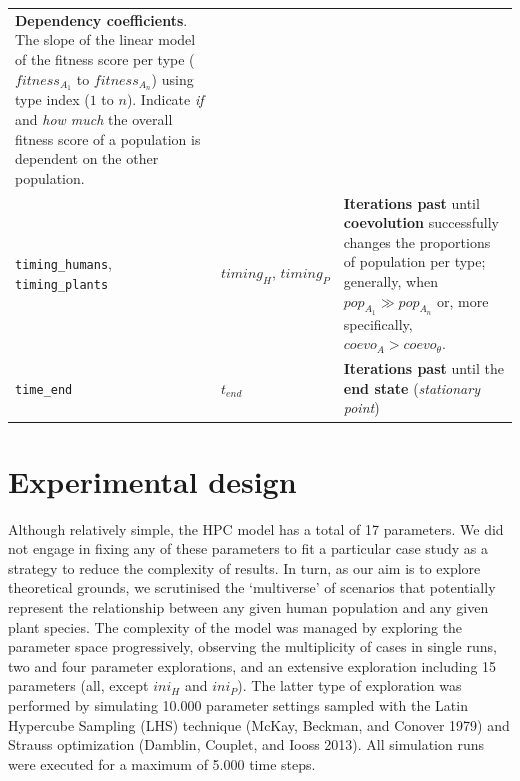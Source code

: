 \documentclass[
]{book}
\begin{document}
\begin{longtable}[]{@{}lll@{}}
\begin{minipage}[t]{0.34\columnwidth}
\textbf{Dependency coefficients}. The slope of the linear model of the fitness score per type (\(fitness_{A_1}\) to \(fitness_{A_n}\)) using type index (\(1\) to \(n\)). Indicate \emph{if} and \emph{how much} the overall fitness score of a population is dependent on the other population.\strut
\end{minipage}\tabularnewline
\begin{minipage}[t]{0.36\columnwidth}\raggedright
\texttt{timing\_humans}, \texttt{timing\_plants}\strut
\end{minipage} & \begin{minipage}[t]{0.21\columnwidth}\raggedright
\(timing_{H},\,timing_{P}\)\strut
\end{minipage} & \begin{minipage}[t]{0.34\columnwidth}\raggedright
\textbf{Iterations past} until \textbf{coevolution} successfully changes the proportions of population per type; generally, when \(pop_{A_1}\gg pop_{A_n}\) or, more specifically, \(coevo_A>coevo_{\theta}\).\strut
\end{minipage}\tabularnewline
\begin{minipage}[t]{0.36\columnwidth}\raggedright
\texttt{time\_end}\strut
\end{minipage} & \begin{minipage}[t]{0.21\columnwidth}\raggedright
\(t_{end}\)\strut
\end{minipage} & \begin{minipage}[t]{0.34\columnwidth}\raggedright
\textbf{Iterations past} until the \textbf{end state} (\emph{stationary point})\strut
\end{minipage}\tabularnewline
\bottomrule
\end{longtable}

\newpage

\hypertarget{experimental-design}{%
\section*{Experimental design}\label{experimental-design}}

Although relatively simple, the HPC model has a total of 17 parameters. We did not engage in fixing any of these parameters to fit a particular case study as a strategy to reduce the complexity of results. In turn, as our aim is to explore theoretical grounds, we scrutinised the `multiverse' of scenarios that potentially represent the relationship between any given human population and any given plant species. The complexity of the model was managed by exploring the parameter space progressively, observing the multiplicity of cases in single runs, two and four parameter explorations, and an extensive exploration including 15 parameters (all, except \(ini_H\) and \(ini_P\)). The latter type of exploration was performed by simulating 10.000 parameter settings sampled with the Latin Hypercube Sampling (LHS) technique (McKay, Beckman, and Conover 1979) and Strauss optimization (Damblin, Couplet, and Iooss 2013). All simulation runs were executed for a maximum of 5.000 time steps.
\end{document}
